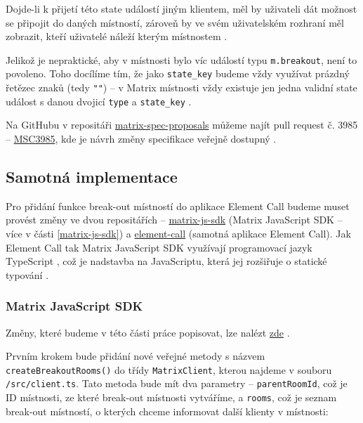 Dojde-li k přijetí této state událostí jiným klientem, měl by uživateli dát
možnost se připojit do daných místností, zároveň by ve svém uživatelském
rozhraní měl zobrazit, kteří uživatelé náleží kterým místnostem
\parencite{GitHub-MSC3985}.

Jelikož je nepraktické, aby v místnosti bylo víc událostí typu
\texttt{m.breakout}, není to povoleno. Toho docílíme tím, že jako
\texttt{state_key} budeme vždy využívat prázdný řetězec znaků (tedy
\texttt{""}) \parencite{GitHub-MSC3985} -- v Matrix místnosti vždy
existuje jen jedna validní state událost s danou dvojicí \texttt{type}
a \texttt{state_key} \parencite{MatrixORG-Spec}.

Na GitHubu v repositáři
\href{https://github.com/matrix-org/matrix-spec-proposals}{matrix-spec-proposals}
můžeme najít pull request č. 3985 --
\href{https://github.com/matrix-org/matrix-spec-proposals/pull/3985}{MSC3985},
kde je návrh změny specifikace veřejně dostupný \parencite{GitHub-MSC3985}.

\subsection{Samotná implementace}

Pro přidání funkce break-out místností do aplikace Element Call budeme muset
provést změny ve dvou repositářích --
\href{https://github.com/matrix-org/matrix-js-sdk/}{matrix-js-sdk} (Matrix
JavaScript SDK -- více v části \ref{matrix-js-sdk}) a
\href{https://github.com/vector-im/element-call/}{element-call} (samotná
aplikace Element Call). Jak Element Call tak Matrix JavaScript SDK využívají
programovací jazyk TypeScript \parencite{GitHub-MatrixJSSDK,
    GitHub-ElementCall}, což je nadstavba na JavaScriptu, která jej rozšiřuje o
statické typování \parencite{TypeScript-Homepage}.

\subsubsection{Matrix JavaScript SDK}

Změny, které budeme v této části práce popisovat, lze nalézt
\href{https://github.com/matrix-org/matrix-js-sdk/pull/3753/}{zde}
\parencite{GitHub-MatrixJSSDK-BreakoutRooms}.

Prvním krokem bude přidání nové veřejné metody s názvem
\texttt{createBreakoutRooms()} do třídy
\texttt{MatrixClient}, kterou najdeme v souboru
\texttt{/src/client.ts}. Tato metoda bude mít dva parametry --
\texttt{parentRoomId}, což je ID místnosti, ze které break-out
místnosti vytváříme, a \texttt{rooms}, což je seznam break-out
místností, o kterých chceme informovat další klienty v místnosti:

